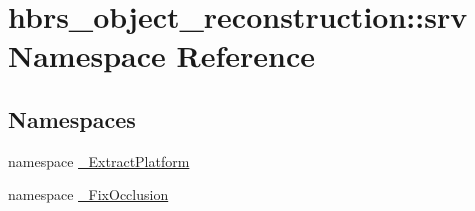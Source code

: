 \hypertarget{namespacehbrs__object__reconstruction_1_1srv}{\section{hbrs\-\_\-object\-\_\-reconstruction\-:\-:srv \-Namespace \-Reference}
\label{namespacehbrs__object__reconstruction_1_1srv}
}
\subsection*{\-Namespaces}
\begin{DoxyCompactItemize}
\item 
namespace \hyperlink{namespacehbrs__object__reconstruction_1_1srv_1_1___extract_platform}{\-\_\-\-Extract\-Platform}
\item 
namespace \hyperlink{namespacehbrs__object__reconstruction_1_1srv_1_1___fix_occlusion}{\-\_\-\-Fix\-Occlusion}
\end{DoxyCompactItemize}
